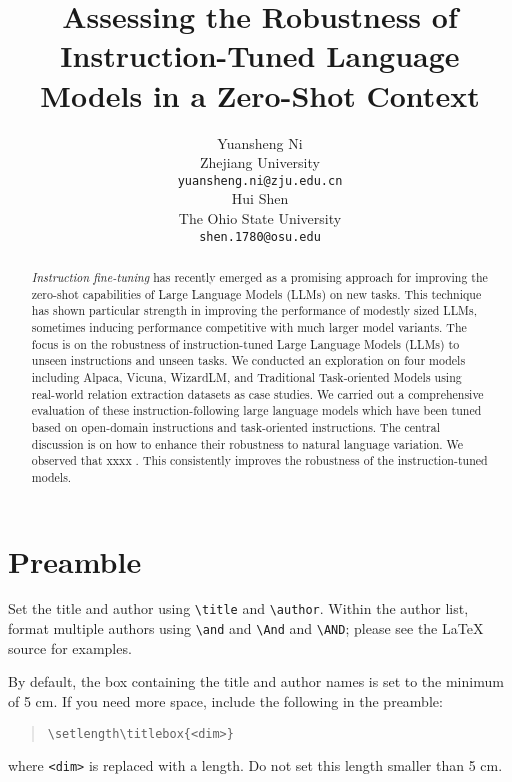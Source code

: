 \documentclass[11pt]{article}
\title{Assessing the Robustness of Instruction-Tuned Language Models in a Zero-Shot Context}
\author{%
Yuansheng Ni \\
  Zhejiang University\\
  \texttt{yuansheng.ni@zju.edu.cn} \\
  \And 
  Hui Shen \\
  The Ohio State University\\
  \texttt{shen.1780@osu.edu}
}
\begin{document}
\maketitle
\begin{abstract}
  \emph{Instruction fine-tuning} has recently emerged as a promising approach for improving the zero-shot capabilities of Large Language Models (LLMs) on new tasks.
  This technique has shown particular strength in improving the performance of modestly sized LLMs, sometimes inducing performance competitive with much larger model variants.
  The focus is on the robustness of instruction-tuned Large Language Models (LLMs) to unseen instructions and unseen tasks.
  We conducted an exploration on four models including Alpaca, Vicuna, WizardLM, and Traditional Task-oriented Models using real-world relation extraction datasets as case studies.
  We carried out a comprehensive evaluation of these instruction-following large language models which have been tuned based on open-domain instructions and task-oriented instructions.
  The central discussion is on how to enhance their robustness to natural language variation.
  We observed that xxxx  .
  This consistently improves the robustness of the instruction-tuned models.

\end{abstract}








\section{Preamble}


Set the title and author using \verb|\title| and \verb|\author|. Within the author list, format multiple authors using \verb|\and| and \verb|\And| and \verb|\AND|; please see the \LaTeX{} source for examples.

By default, the box containing the title and author names is set to the minimum of 5 cm. If you need more space, include the following in the preamble:
\begin{quote}
  \begin{verbatim}
\setlength\titlebox{<dim>}
\end{verbatim}
\end{quote}
where \verb|<dim>| is replaced with a length. Do not set this length smaller than 5 cm.
\end{document}
